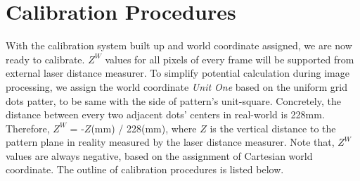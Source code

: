 \section{Calibration Procedures}
%
With the calibration system built up and world coordinate assigned, we are now ready to calibrate. \(Z^{W}\) values for all pixels of every frame will be supported from external laser distance measurer. To simplify potential calculation during image processing, we assign the world coordinate \emph{Unit One} based on the uniform grid dots patter, to be same with the side of pattern's unit-square. Concretely, the distance between every two adjacent dots' centers in real-world is 228mm. Therefore, \(Z^{W}\) = -\(Z\)(mm) / 228(mm), where \(Z\) is the vertical distance to the pattern plane in reality measured by the laser distance measurer. Note that, \(Z^{W}\) values are always negative, based on the assignment of Cartesian world coordinate. The outline of calibration procedures is listed below.
%
